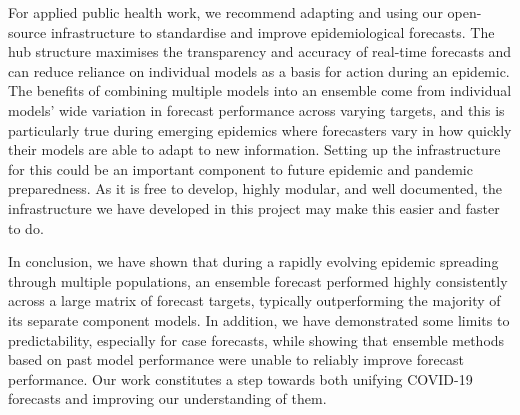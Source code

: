 \documentclass[
]{article}
\begin{document}
For applied public health work, we recommend adapting and using our
open-source infrastructure to standardise and improve epidemiological
forecasts. The hub structure maximises the transparency and accuracy of
real-time forecasts and can reduce reliance on individual models as a
basis for action during an epidemic. The benefits of combining multiple
models into an ensemble come from individual models' wide variation in
forecast performance across varying targets, and this is particularly
true during emerging epidemics where forecasters vary in how quickly
their models are able to adapt to new information. Setting up the
infrastructure for this could be an important component to future
epidemic and pandemic preparedness. As it is free to develop, highly
modular, and well documented, the infrastructure we have developed in
this project may make this easier and faster to do.

In conclusion, we have shown that during a rapidly evolving epidemic
spreading through multiple populations, an ensemble forecast performed
highly consistently across a large matrix of forecast targets, typically
outperforming the majority of its separate component models. In
addition, we have demonstrated some limits to predictability, especially
for case forecasts, while showing that ensemble methods based on past
model performance were unable to reliably improve forecast performance.
Our work constitutes a step towards both unifying COVID-19 forecasts and
improving our understanding of them.
\end{document}
